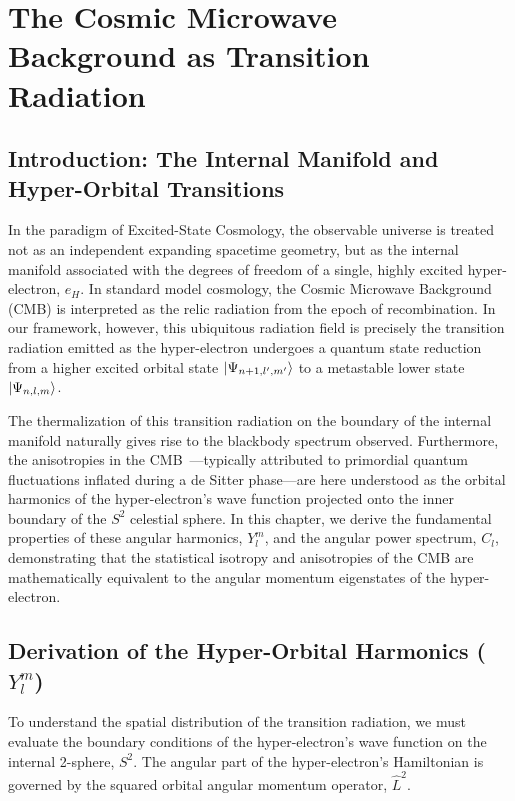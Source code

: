 \section{The Cosmic Microwave Background as Transition Radiation}

\subsection{Introduction: The Internal Manifold and Hyper-Orbital Transitions}

In the paradigm of Excited-State Cosmology, the observable universe is treated not as an independent expanding spacetime geometry, but as the internal manifold associated with the degrees of freedom of a single, highly excited hyper-electron, $e_H$. In standard model cosmology, the Cosmic Microwave Background (CMB) is interpreted as the relic radiation from the epoch of recombination. In our framework, however, this ubiquitous radiation field is precisely the transition radiation emitted as the hyper-electron undergoes a quantum state reduction from a higher excited orbital state $\ket{\Psi_{n+1, l', m'}}$ to a metastable lower state $\ket{\Psi_{n, l, m}}$. \cite{McGaugh2016, Bardeen1980, Friedmann1922}

The thermalization of this transition radiation on the boundary of the internal manifold naturally gives rise to the blackbody spectrum observed. Furthermore, the anisotropies in the CMB~\cite{Planck2018}—typically attributed to primordial quantum fluctuations inflated during a de Sitter phase—are here understood as the orbital harmonics of the hyper-electron's wave function projected onto the inner boundary of the $S^2$ celestial sphere. In this chapter, we derive the fundamental properties of these angular harmonics, $Y_l^m$, and the angular power spectrum, $C_l$, demonstrating that the statistical isotropy and anisotropies of the CMB are mathematically equivalent to the angular momentum eigenstates of the hyper-electron.

\subsection{Derivation of the Hyper-Orbital Harmonics ($Y_l^m$)}

To understand the spatial distribution of the transition radiation, we must evaluate the boundary conditions of the hyper-electron's wave function on the internal 2-sphere, $S^2$. The angular part of the hyper-electron's Hamiltonian is governed by the squared orbital angular momentum operator, $\hat{L}^2$. 

